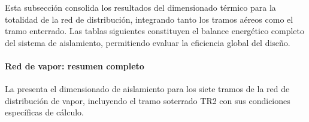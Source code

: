 \documentclass[12pt]{article}
\begin{document}
Esta subsección consolida los resultados del dimensionado térmico para la totalidad de la red de distribución, integrando tanto los tramos aéreos como el tramo enterrado. Las tablas siguientes constituyen el balance energético completo del sistema de aislamiento, permitiendo evaluar la eficiencia global del diseño.

\paragraph{Red de vapor: resumen completo}
\label{par:resumen_vapor_completo}

La  presenta el dimensionado de aislamiento para los siete tramos de la red de distribución de vapor, incluyendo el tramo soterrado TR2 con sus condiciones específicas de cálculo.
\end{document}
